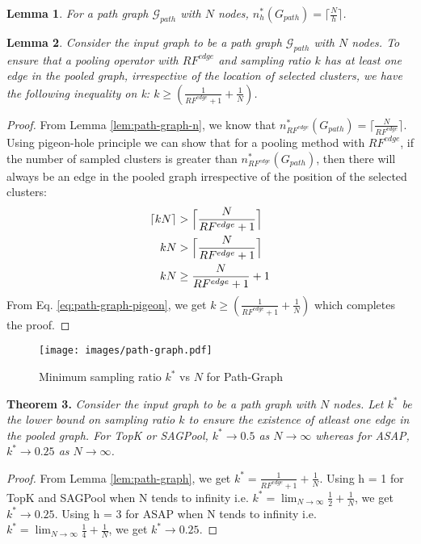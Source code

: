 \documentclass[letterpaper]{article} \usepackage{aaai20}  \usepackage{times}  \usepackage{helvet} \usepackage{courier}  \usepackage[hyphens]{url}  \usepackage{graphicx} \urlstyle{rm} \def\UrlFont{\rm}  \usepackage{graphicx}  \frenchspacing  \setlength{\pdfpagewidth}{8.5in}  \setlength{\pdfpageheight}{11in}
\newtheorem{lemma}{Lemma}
\begin{document}
	
	
	\begin{lemma}
		\label{lem:path-graph-n}
		For a path graph $\mathcal{G}_{path}$ with $N$ nodes, $n^{*}_{h}({G}_{path}) = \lceil \frac{N}{h} \rceil$.
	\end{lemma}
	
	
\begin{lemma}
		\label{lem:path-graph}
		Consider the input graph to be a path graph $\mathcal{G}_{path}$ with $N$ nodes. To ensure that a pooling operator with $RF^{edge}$ and sampling ratio $k$ has at least one edge in the pooled graph, irrespective of the location of selected clusters, we have the following inequality on k: $k \geq (\frac{1}{RF^{edge}+1} + \frac{1}{N})$.
	\end{lemma}
	\begin{proof}
		From Lemma \eqref{lem:path-graph-n}, we know that $n^{*}_{RF^{edge}}({G}_{path}) = \lceil \frac{N}{RF^{edge}} \rceil$. Using pigeon-hole principle we can show that for a pooling method with $RF^{edge}$, if the number of sampled clusters is greater than $n^{*}_{RF^{edge}}({G}_{path})$, then there will always be an edge in the pooled graph irrespective of the position of the selected clusters: 
		\begin{equation}
		\label{eq:path-graph-pigeon}
		\begin{split}
		\lceil kN \rceil &> \Bigl \lceil \frac{N}{RF^{edge}+1} \Bigr \rceil \\
kN &> \Bigl \lceil \frac{N}{RF^{edge}+1} \Bigr \rceil \\
kN &\geq \frac{N}{RF^{edge}+1} + 1
		\end{split}
		\end{equation}
		From Eq. \eqref{eq:path-graph-pigeon}, we get $k \geq (\frac{1}{RF^{edge}+1} + \frac{1}{N})$ which completes the proof.
	\end{proof}
	
	
	\begin{figure}[!ht]
	\centering
	\texttt{[image: images/path-graph.pdf]}
	\caption{\label{fig:path-graph} Minimum sampling ratio $k^{*}$ vs $N$ for Path-Graph}
	\end{figure}
	
	
\textbf{Theorem 3.}
	\textit{
		Consider the input graph to be a path graph with $N$ nodes. Let $k^{*}$ be the lower bound on sampling ratio $k$ to ensure the existence of atleast one edge in the pooled graph. For TopK or SAGPool,  $k^{*} \rightarrow 0.5$ as $N \rightarrow \infty$ whereas for ASAP, $k^{*} \rightarrow 0.25$ as $N \rightarrow \infty$.
	}
	\begin{proof}
		From Lemma \eqref{lem:path-graph}, we get $k^{*} = \frac{1}{RF^{edge}+1} + \frac{1}{N}$. Using 	h = 1 for TopK and SAGPool when N tends to infinity i.e. $k^{*} = \lim_{N \rightarrow \infty} \frac{1}{2} + \frac{1}{N}$, we get $k^{*} \rightarrow 0.25$. Using h = 3 for ASAP when N tends to infinity i.e. $k^{*} = \lim_{N \rightarrow \infty} \frac{1}{4} + \frac{1}{N}$, we get $k^{*} \rightarrow 0.25$.
	\end{proof}
	
\end{document}

